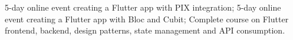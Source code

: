 \documentclass[
    10pt,
    english,
]{article}
\begin{document}
{}
{5-day online event creating a Flutter app with PIX integration;}
{5-day online event creating a Flutter app with Bloc and Cubit;}
{Complete course on Flutter frontend, backend, design patterns, state management and API consumption.}
\end{document}

